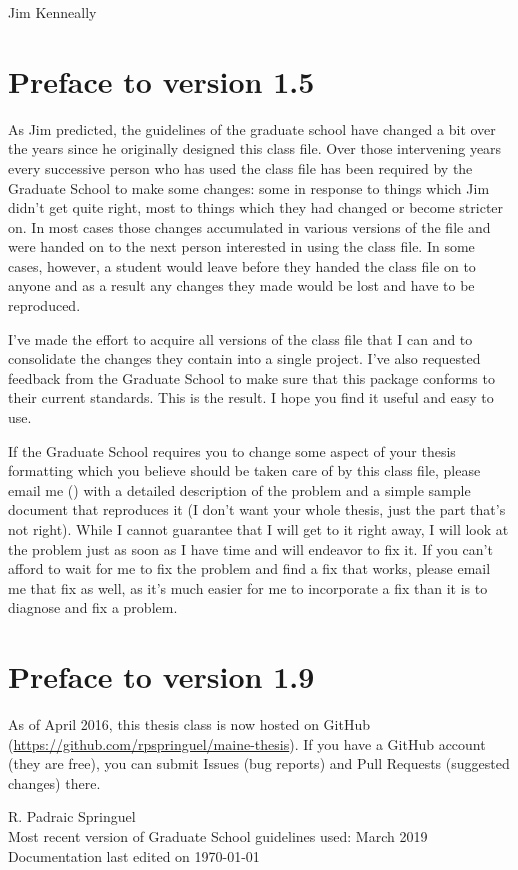 \begin{preface}
 \begin{flushright}
 Jim Kenneally
 \end{flushright}

\section{Preface to version 1.5}
As Jim predicted, the guidelines of the graduate school have changed a bit over the years since he originally designed this class file.  Over those intervening years every successive person who has used the class file has been required by the Graduate School to make some changes: some in response to things which Jim didn't get quite right, most to things which they had changed or become stricter on.  In most cases those changes accumulated in various versions of the file and were handed on to the next person interested in using the class file.  In some cases, however, a student would leave before they handed the class file on to anyone and as a result any changes they made would be lost and have to be reproduced.

I've made the effort to acquire all versions of the class file that I can and to consolidate the changes they contain into a single project.  I've also requested feedback from the Graduate School to make sure that this package conforms to their current standards.  This is the result.  I hope you find it useful and easy to use.

If the Graduate School requires you to change some aspect of your thesis formatting which you believe should be taken care of by this class file, please email me (\email) with a detailed description of the problem and a simple sample document that reproduces it (I don't want your whole thesis, just the part that's not right).  While I cannot guarantee that I will get to it right away, I will look at the problem just as soon as I have time and will endeavor to fix it.  If you can't afford to wait for me to fix the problem and find a fix that works, please email me that fix as well, as it's much easier for me to incorporate a fix than it is to diagnose and fix a problem.

\section{Preface to version 1.9}
As of April 2016, this thesis class is now hosted on GitHub (\url{https://github.com/rpspringuel/maine-thesis}).  If you have a GitHub account (they are free), you can submit Issues (bug reports) and Pull Requests (suggested changes) there.

\begin{flushright}
R. Padraic Springuel\\
Most recent version of Graduate School guidelines used: March 2019\\
Documentation last edited on \today
\end{flushright}

\end{preface}

